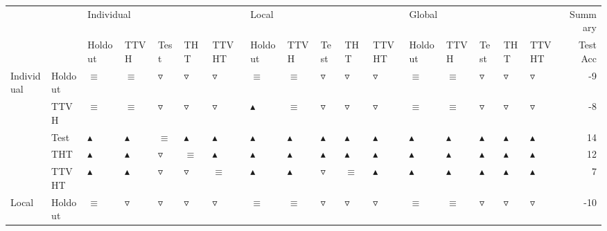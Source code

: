 \begin{table}
\centering
\label{tab:statistical_similar_sets_performance}
\begin{tabular}{lllllllllllllllllr}
\toprule
       &       & \multicolumn{5}{l}{Individual} & \multicolumn{5}{l}{Local} & \multicolumn{5}{l}{Global} &  Summary \\
       &       &           Holdout &              TTVH &             Test &               THT &             TTVHT &           Holdout &              TTVH &              Test &               THT &             TTVHT &           Holdout &              TTVH &              Test &               THT &             TTVHT & Test Acc \\
\midrule
Individual & Holdout &          $\equiv$ &          $\equiv$ &  $\triangledown$ &   $\triangledown$ &   $\triangledown$ &          $\equiv$ &          $\equiv$ &   $\triangledown$ &   $\triangledown$ &   $\triangledown$ &          $\equiv$ &          $\equiv$ &   $\triangledown$ &   $\triangledown$ &   $\triangledown$ &       -9 \\
       & TTVH &          $\equiv$ &          $\equiv$ &  $\triangledown$ &   $\triangledown$ &   $\triangledown$ &  $\blacktriangle$ &          $\equiv$ &   $\triangledown$ &   $\triangledown$ &   $\triangledown$ &          $\equiv$ &          $\equiv$ &   $\triangledown$ &   $\triangledown$ &   $\triangledown$ &       -8 \\
       & Test &  $\blacktriangle$ &  $\blacktriangle$ &         $\equiv$ &  $\blacktriangle$ &  $\blacktriangle$ &  $\blacktriangle$ &  $\blacktriangle$ &  $\blacktriangle$ &  $\blacktriangle$ &  $\blacktriangle$ &  $\blacktriangle$ &  $\blacktriangle$ &  $\blacktriangle$ &  $\blacktriangle$ &  $\blacktriangle$ &       14 \\
       & THT &  $\blacktriangle$ &  $\blacktriangle$ &  $\triangledown$ &          $\equiv$ &  $\blacktriangle$ &  $\blacktriangle$ &  $\blacktriangle$ &  $\blacktriangle$ &  $\blacktriangle$ &  $\blacktriangle$ &  $\blacktriangle$ &  $\blacktriangle$ &  $\blacktriangle$ &  $\blacktriangle$ &  $\blacktriangle$ &       12 \\
       & TTVHT &  $\blacktriangle$ &  $\blacktriangle$ &  $\triangledown$ &   $\triangledown$ &          $\equiv$ &  $\blacktriangle$ &  $\blacktriangle$ &   $\triangledown$ &          $\equiv$ &  $\blacktriangle$ &  $\blacktriangle$ &  $\blacktriangle$ &  $\blacktriangle$ &  $\blacktriangle$ &  $\blacktriangle$ &        7 \\
Local & Holdout &          $\equiv$ &   $\triangledown$ &  $\triangledown$ &   $\triangledown$ &   $\triangledown$ &          $\equiv$ &          $\equiv$ &   $\triangledown$ &   $\triangledown$ &   $\triangledown$ &          $\equiv$ &          $\equiv$ &   $\triangledown$ &   $\triangledown$ &   $\triangledown$ &      -10 \\

\end{tabular}
\end{table}

